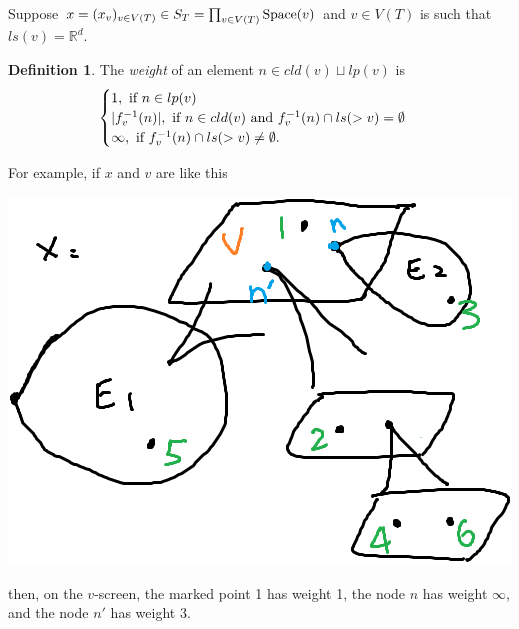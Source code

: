 \documentclass[11pt]{article}
\theoremstyle{definition}
\newtheorem{dfn}[thm]{Definition}
\theoremstyle{remark}
\def\R{\mathbb{R}}
\def\tn#1{\textnormal{#1}}
\begin{document}
Suppose $x=(x_v)_{v\in V(T)}\in S_T=\prod_{v\in V(T)}\tn{Space}(v)$ and $v\in V(T)$ is such that $ls(v)=\R^d$. 

\begin{dfn}
The {\it weight} of an element $n\in cld(v)\sqcup lp(v)$ is 
$$\begin{cases}
1,\tn{ if }n\in lp(v)\\
|f_v^{-1}(n)|, \tn{ if }n\in cld(v) \tn{ and } f_v^{-1}(n)\cap ls(>v)=\emptyset\\
\infty, \tn{ if }f_v^{-1}(n)\cap ls(>v)\neq\emptyset.
\end{cases}$$
\end{dfn}
For example, if $x$ and $v$ are like this 

\includegraphics[scale=0.5]{ST2_fig}

then, on the $v$-screen, the marked point 1 has weight 1, the node $n$ has weight $\infty$, and the node $n'$ has weight 3.
\end{document}
